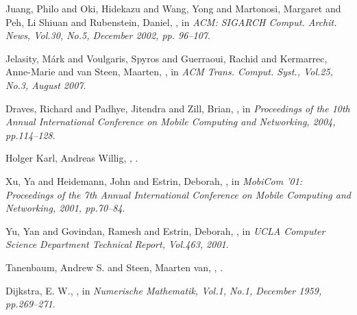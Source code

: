 \documentclass[USenglish]{uit-thesis}
\begin{document}
\begin{thebibliography}{9}
Juang, Philo and Oki, Hidekazu and Wang, Yong and Martonosi, Margaret and Peh, Li Shiuan and Rubenstein, Daniel,
,
\newblock in {\em ACM: SIGARCH Comput. Archit. News, Vol.30, No.5, December 2002, pp. 96--107}.


Jelasity, M\'{a}rk and Voulgaris, Spyros and Guerraoui, Rachid and Kermarrec, Anne-Marie and van Steen, Maarten,
,
\newblock in {\em ACM Trans. Comput. Syst., Vol.25, No.3, August 2007}.

Draves, Richard and Padhye, Jitendra and Zill, Brian,
,
\newblock in {\em Proceedings of the 10th Annual International Conference on Mobile Computing and Networking, 2004, pp.114--128}.

Holger Karl, Andreas Willig,
,
.

Xu, Ya and Heidemann, John and Estrin, Deborah,
,
\newblock in {\em MobiCom '01: Proceedings of the 7th Annual International Conference on Mobile Computing and Networking, 2001, pp.70--84}.

Yu, Yan and Govindan, Ramesh and Estrin, Deborah,
,
\newblock in {\em UCLA Computer Science Department Technical Report, Vol.463, 2001}.

Tanenbaum, Andrew S. and Steen, Maarten van,
,
.

Dijkstra, E. W.,
,
\newblock in {\em Numerische Mathematik, Vol.1, No.1, December 1959, pp.269--271}.



\end{thebibliography}
\end{document}

